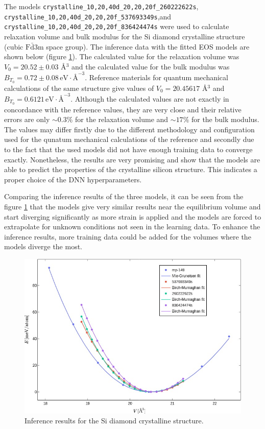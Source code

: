 The models \texttt{crystalline\_10,20,40d\_20,20,20f\_260222622s},\linebreak
\texttt{crystalline\_10,20,40d\_20,20,20f\_537693349s},\linebreak and
\texttt{crystalline\_10,20,40d\_20,20,20f\_836424474s} were used to calculate
relaxation volume and bulk modulus for the Si diamond crystalline structure
(cubic $\mathrm{F}\bar{\mathrm{d}}\mathrm{3m}$ space group). The inference
data with the fitted EOS models are shown below (figure
\ref{fig:crystalline_inference}). The calculated value for the relaxation
volume was $V_0 = 20.52 \pm 0.03$ \AA$^3$ and the calculated value for the
bulk modulus was
$B_{T_0} = 0.72 \pm 0.08 \, \mathrm{eV} \cdot \text{\AA}^{-3}$. Reference
materials for quantum mechanical calculations of the same structure give
values of $V_0 = 20.45617$ \AA$^3$ and
$B_{T_0} = 0.6121 \, \mathrm{eV} \cdot \text{\AA}^{-3}$\cite{osti_1190959}.
Although the calculated values are not exactly in concordance with the
reference values, they are very close and their relative errors are
only $\sim 0.3\%$ for the relaxation volume and $\sim 17 \%$ for the bulk
modulus. The values may differ firstly due to the different methodology and
configuration used for the qunatum mechanical calculations of the reference
and secondly due to the fact that the used models did not have enough training
data to converge exactly. Nonetheless, the results are very promising and show
that the models are able to predict the properties of the crystalline silicon
structure. This indicates a proper choice of the DNN hyperparameters.

Comparing the inference results of the three models, it can be seen from the
figure \ref{fig:crystalline_inference} that the models give very similar
results near the equilibrium volume and start diverging significantly as more
strain is applied and the models are forced to extrapolate for unknown
conditions not seen in the learning data. To enhance the inference results,
more training data could be added for the volumes where the models diverge the
most.

\begin{figure}
  \begin{center}
    \includegraphics[width=.8\textwidth]{
      asset/crystalline_ev_curves.jpg
    }
  \end{center}
  \caption{Inference results for the Si diamond crystalline structure.}
  \label{fig:crystalline_inference}
\end{figure}

